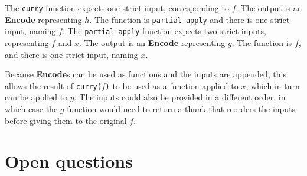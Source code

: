 \documentclass{article}
\newcommand{\encode}{\textbf{Encode}\xspace}
\newcommand{\encodes}{\textbf{Encode}s\xspace}
\begin{document}
The \texttt{curry} function expects one strict input, corresponding to
$f$.  The output is an \encode representing $h$. The function is
\texttt{partial-apply} and there is one strict input, naming $f$. The
\texttt{partial-apply} function expects two strict inputs,
representing $f$ and $x$. The output is an \encode representing
$g$. The function is $f$, and there is one strict input, naming $x$.

Because \encodes can be used as functions and the inputs are appended,
this allows the result of \texttt{curry($f$)} to be used as a function
applied to $x$, which in turn can be applied to $y$. The inputs could
also be provided in a different order, in which case the $g$ function would
need to return a thunk that reorders the inputs before giving them to
the original $f$.

\section{Open questions}
\end{document}
